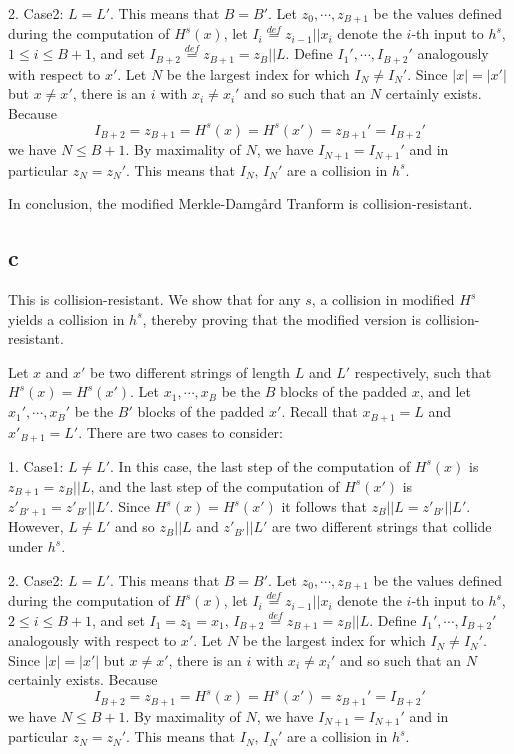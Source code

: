 \documentclass[a4papers]{ctexart}
\begin{document}
2. Case2: $L=L'$. This means that $B=B'$. Let $z_0,\cdots,z_{B+1}$ be the values defined during
the computation of $H^s(x)$, let $I_i \overset{def}{=} z_{i-1}||x_i$ denote the $i$-th input to $h^s$, $1\le i\le B+1$,
 and set $I_{B+2}\overset{def}{=}z_{B+1}=z_B||L$. Define $I_1',\cdots,I_{B+2}'$ analogously with respect to $x'$.
 Let $N$ be the largest index for which $I_N\ne I_{N}'$. Since $|x|=|x'|$ but $x\ne x'$, there is an $i$ with $x_i\ne x_i'$
 and so such that an $N$ certainly exists. Because
 \[ I_{B+2}=z_{B+1}=H^s(x)=H^s(x')=z_{B+1}'=I_{B+2}' \]
 we have $N\le B+1$. By maximality of $N$, we have $I_{N+1}=I_{N+1}'$ and in particular $z_{N}=z_{N}'$. 
 This means that $I_N,\, I_N'$ are a collision in $h^s$.

 In conclusion, the modified Merkle-Damgård Tranform is collision-resistant.


\subsection*{c}
This is collision-resistant.
We show that for any $s$, a collision in modified $H^s$ yields a collision in $h^s$, 
thereby proving that the modified version is collision-resistant.

Let $x$ and $x'$ be two different strings of length $L$ and $L'$ respectively, such that
$H^s(x)=H^s(x')$. Let $x_1,\cdots,x_B$ be the $B$ blocks of the padded $x$, and let $x_1',\cdots,x_B'$ 
be the $B'$ blocks of the padded $x'$. Recall that $x_{B+1}=L$ and $x'_{B+1}=L'$. 
There are two cases to consider:

1. Case1: $L\ne L'$. In this case, the last step of the computation of $H^s(x)$ is $z_{B+1}=z_{B}||L$, and
the last step of the computation of $H^s(x')$ is $z'_{B'+1}=z'_{B'}||L'$. Since $H^s(x)=H^s(x')$ it follows that 
$z_{B}||L = z'_{B'}||L'$. However, $L \ne L'$ and so $z_{B}||L$ and $z'_{B'}||L'$ are two different strings that collide under $h^s$.

2. Case2: $L=L'$. This means that $B=B'$. Let $z_0,\cdots,z_{B+1}$ be the values defined during
the computation of $H^s(x)$, let $I_i \overset{def}{=} z_{i-1}||x_i$ denote the $i$-th input to $h^s$, $2\le i\le B+1$,
 and set $I_1 = z_1 = x_1,\, I_{B+2}\overset{def}{=}z_{B+1}=z_B||L$. Define $I_1',\cdots,I_{B+2}'$ analogously with respect to $x'$.
 Let $N$ be the largest index for which $I_N\ne I_{N}'$. Since $|x|=|x'|$ but $x\ne x'$, there is an $i$ with $x_i\ne x_i'$
 and so such that an $N$ certainly exists. Because
 \[ I_{B+2}=z_{B+1}=H^s(x)=H^s(x')=z_{B+1}'=I_{B+2}' \]
 we have $N\le B+1$. By maximality of $N$, we have $I_{N+1}=I_{N+1}'$ and in particular $z_{N}=z_{N}'$. 
 This means that $I_N,\, I_N'$ are a collision in $h^s$.
\end{document}
